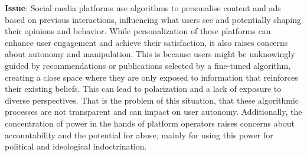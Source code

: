 \textbf{Issue}: Social media platforms use algorithms to personalise content and ads based on previous interactions, influencing what users see and potentially shaping their opinions and behavior.
While personalization of these platforms can enhance user engagement and achieve their satisfaction, it also raises concerns about autonomy and manipulation.
This is because users might be unknowingly guided by recommendations or publications selected by a fine-tuned algorithm, creating a close space where they are only exposed to information that reinforces their existing beliefs.
This can lead to polarization and a lack of exposure to diverse perspectives.
That is the problem of this situation, that these algorithmic processes are not transparent and can impact on user autonomy.
Additionally, the concentration of power in the hands of platform operators raises concerns about accountability and the potential for abuse, mainly for using this power for political and ideological indoctrination.
